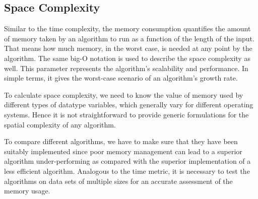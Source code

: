 \subsection{Space Complexity} 
Similar to the time complexity, the memory consumption quantifies the amount of memory taken by an algorithm to run as a function of the length of the input. That means how much memory, in the worst case, is needed at any point by the algorithm. The same big-O notation is used to describe the space complexity as well. This parameter represents the algorithm’s scalability and performance. In simple terms, it gives the worst-case scenario of an algorithm’s growth rate.

To calculate space complexity, we need to know the value of memory used by different types of datatype variables, which generally vary for different operating systems. Hence it is not straightforward to provide generic formulations for the spatial complexity of any algorithm.

To compare different algorithms, we have to make sure that they have been suitably implemented since poor memory management can lead to a superior algorithm under-performing as compared with the superior implementation of a less efficient algorithm. Analogous to the time metric, it is necessary to test the algorithms on data sets of multiple sizes for an accurate assessment of the memory usage. 







